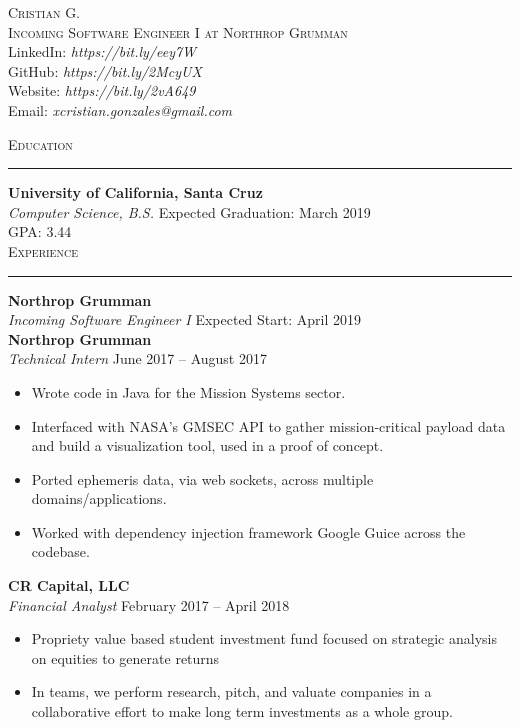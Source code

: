 \documentclass{res}
\begin{document}
\begin{resume}

\begin{center}
\textsc{{\Huge Cristian G.}}\\
\vspace{1mm}
\textsc{\large Incoming Software Engineer I at Northrop Grumman}\\
\vspace{1mm}
LinkedIn: \textit{https://bit.ly/eey7W}\\
GitHub: \textit{https://bit.ly/2McyUX}\\
Website: \textit{https://bit.ly/2vA649}\\
Email: \textit{xcristian.gonzales@gmail.com}\\
\end{center}


\textsc{{\Large Education}}
\vspace{0.5mm}
\hrule width18.5cm
\textbf{University of California, Santa Cruz}\\
\textit{Computer Science, B.S.}
\hfill
Expected Graduation: March 2019\\
GPA: 3.44\\

\textsc{{\Large Experience}}
\vspace{0.5mm}
\hrule width18.5cm
\textbf{Northrop Grumman}\\
\textit{Incoming Software Engineer I}
\hfill
Expected Start: April 2019\\[2mm]
\textbf{Northrop Grumman}\\
\textit{Technical Intern}
\hfill
June 2017 -- August 2017\\[1mm]
	\begin{itemize}
		\vspace{-3mm}
		\item Wrote code in Java for the Mission Systems sector.
		\item Interfaced with NASA's GMSEC API to gather mission-critical payload data and build a visualization tool, used in a proof of concept.
		\item Ported ephemeris data, via web sockets, across multiple domains/applications.
		\item Worked with dependency injection framework Google Guice across the codebase.
	\end{itemize}
\textbf{CR Capital, LLC}\\
\textit{Financial Analyst}
\hfill
February 2017 -- April 2018\\
	\begin{itemize}
		\vspace{-3mm}
		\item Propriety value based student investment fund focused on strategic analysis on equities to generate returns
		\item In teams, we perform research, pitch, and valuate companies in a collaborative effort to make long term investments as a whole group.
	\end{itemize}
	\vspace{0.5mm}


\end{resume}
\end{document}
